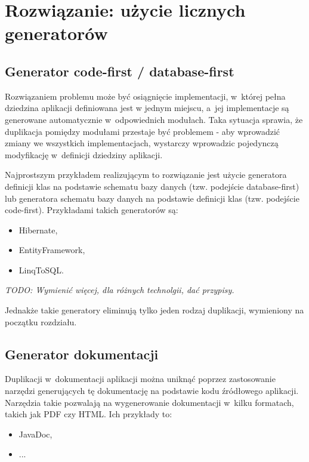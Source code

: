 \section{Rozwiązanie: użycie licznych generatorów}

\subsection{Generator code-first / database-first}

Rozwiązaniem problemu może być osiągnięcie implementacji, w~której pełna dziedzina aplikacji definiowana jest w jednym miejscu, a~jej implementacje są generowane automatycznie w~odpowiednich modułach.
Taka sytuacja sprawia, że duplikacja pomiędzy modułami przestaje być problemem - aby wprowadzić zmiany we wszystkich implementacjach, wystarczy wprowadzic pojedynczą modyfikację w~definicji dziedziny aplikacji.

Najprostszym przykładem realizującym to rozwiązanie jest użycie generatora definicji klas na podstawie schematu bazy danych (tzw. podejście database-first) lub generatora schematu bazy danych na podstawie definicji klas (tzw. podejście code-first).
Przykładami takich generatorów są:

\begin{itemize}
 \item Hibernate,
 \item EntityFramework,
 \item LinqToSQL.
\end{itemize}

\emph{TODO: Wymienić więcej, dla różnych technolgii, dać przypisy.}

Jednakże takie generatory eliminują tylko jeden rodzaj duplikacji, wymieniony na początku rozdziału.


\subsection{Generator dokumentacji}

Duplikacji w~dokumentacji aplikacji można uniknąć poprzez zastosowanie narzędzi generujących tę dokumentację na podstawie kodu źródłowego aplikacji.
Narzędzia takie pozwalają na wygenerowanie dokumentacji w~kilku formatach, takich jak PDF czy HTML.
Ich przykłady to:

\begin{itemize}
 \item JavaDoc,
 \item ...
\end{itemize}


